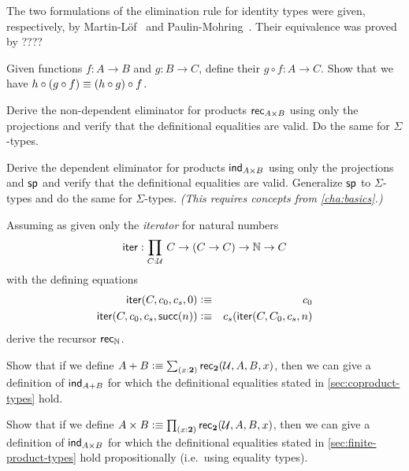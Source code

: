 The two formulations of the elimination rule for identity types were given, respectively, by Martin-L\"{o}f~\cite{pml-id} and Paulin-Mohring~\cite{cpm-id}.  Their equivalence was proved by \cite{cpm-id}????

\sectionExercises

\begin{ex}\label{ex:composition}
  Given functions $f:A\to B$ and $g:B\to C$, define their  $g\circ f:A\to C$.
  Show that we have $h \circ (g\circ f) \equiv (h\circ g)\circ f$.
\end{ex}

\begin{ex}
Derive the non-dependent eliminator for products $\mathsf{rec}_{A\times B} $ using only the projections and verify that the definitional equalities are valid. Do the same for $\Sigma$-types.
\end{ex}

\begin{ex}
  Derive the dependent eliminator for products $\mathsf{ind}_{A\times B}$ using only the projections and $\mathsf{sp}$ and verify that the definitional equalities are valid. Generalize $\mathsf{sp}$ to $\Sigma$-types and do the same for $\Sigma$-types.
  \emph{(This requires concepts from \autoref{cha:basics}.)}
\end{ex}

\begin{ex}
Assuming as given only the \emph{iterator} for natural numbers
\[\ite : \prd{C:\UU} C \to (C \to C) \to \nat \to C \]
with the defining equations
\begin{eqnarray*}
\mathsf{iter}(C,c_0,c_s,0)  & \vcentcolon\equiv & c_0 \\
\mathsf{iter}(C,c_0,c_s,\mathsf{succ}(n)) & \vcentcolon\equiv & c_s(\mathsf{iter}(C,C_0,c_s,n)  
\end{eqnarray*}
derive the recursor $\mathsf{rec}_{\mathbb{N}}$.
\end{ex}

\begin{ex}\label{ex:sum-via-bool}
Show that if we define $A + B \defeq \sm{x:\bool} \rec{\bool}(\UU,A,B,x)$, then we can give a definition of $\mathsf{ind}_{A+B}$ for which the definitional equalities stated in \autoref{sec:coproduct-types} hold.
\end{ex}

\begin{ex}\label{ex:prod-via-bool}
Show that if we define $A \times B \defeq \prd{x:\bool}\rec{\bool}(\UU,A,B,x)$, then we can give a definition of  $\mathsf{ind}_{A\times B}$ for which the definitional equalities stated in \autoref{sec:finite-product-types} hold propositionally (i.e.\ using equality types).
\end{ex}

